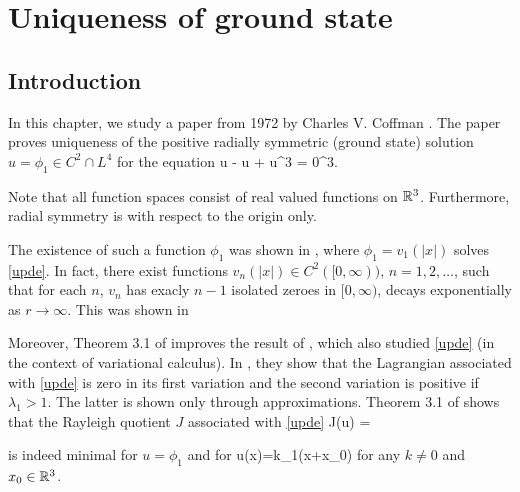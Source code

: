 \newcommand{\intrrr}{\int_{\R^3}}
\chapter{Uniqueness of ground state}

\section{Introduction}

In this chapter, we study a paper from 1972 by Charles V. Coffman \cite{coffm}. 
The paper proves uniqueness of the positive radially symmetric (ground
state) solution $u=\phi_1\in C^2\cap L^4$ for the equation
\be\label{upde}
\Delta u - u + u^3 = 0\quad{}\R^3.
\ee

Note that all function spaces consist of real valued functions on $\mathbb{R}^3$.
Furthermore, radial symmetry is with respect to the origin only. 

The existence of such a function $\phi_1$ was shown in \cite{nehari},
where $\phi_1=v_1(|x|)$ solves \eqref{upde}. In fact, there exist functions
$v_n(|x|)\in C^2([0, \infty))$, $n=1, 2, \ldots$, such that for each $n$, $v_n$
has exacly $n-1$ isolated zeroes in $[0, \infty)$, decays exponentially as
$r\to\infty$. This was shown in \cite{ryder, berger}

Moreover, Theorem 3.1 of \cite{coffm} improves the result of \cite{robinson}, 
which also studied \eqref{upde} (in the context of variational calculus). 
In \cite{robinson}, they show that the Lagrangian associated with \eqref{upde}
is zero in its first variation and the second variation is positive if
$\lambda_1 > 1$. The latter is shown only through approximations. Theorem 3.1 of
\cite{coffm} shows that the Rayleigh quotient $J$ associated with \eqref{upde}
\be\label{rayleigh} 
J(u) = 
\ee

is indeed minimal for $u=\phi_1$ and for 
\be\label{uts}
u(x)=k\phi_1(x+x_0)
\ee
for any $k\neq 0$ and
$x_0\in \mathbb{R}^3$.



